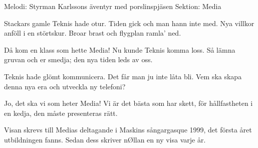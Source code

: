 \begin{song}

\begin{songmeta}
Melodi: Styrman Karlssons äventyr med porslinspjäsen
Sektion: Media
\end{songmeta}

\begin{songtext}
Stackars gamle Teknis hade otur.
Tiden gick och man hann inte med.
Nya villkor anföll i en störtskur.
Broar brast och flygplan ramla' ned.

Då kom en klass som hette Media!
Nu kunde Teknis komma loss.
Så lämna gruvan och er smedja;
den nya tiden leds av oss.

Teknis hade glömt kommunicera.
Det får man ju inte låta bli.
Vem ska skapa denna nya era
och utveckla ny telefoni?

Jo, det ska vi som heter Media!
Vi är det bästa som har skett,
för hållfastheten i en kedja,
den måste presenteras rätt.
\end{songtext}

\begin{songnotes}
Visan skrevs till Medias deltagande i Maskins sångargasque 1999, det första året utbildningen fanns. Sedan dess skriver nØllan en ny visa varje år.
\end{songnotes}

\end{song}
